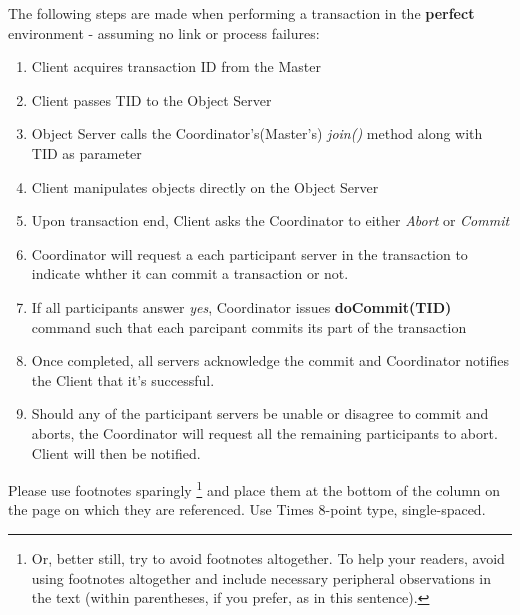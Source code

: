 \documentclass[times, 10pt,twocolumn]{article}
\begin{document}
The following steps are made when performing a transaction in the {\bf perfect} environment - assuming no link or process failures: 
\begin{enumerate}
\item Client acquires transaction ID from the Master
\item Client passes TID to the Object Server
\item Object Server calls the Coordinator's(Master's) {\it join()} method along with TID as parameter
\item Client manipulates objects directly on the Object Server
\item Upon transaction end, Client asks the Coordinator to either {\it Abort} or {\it Commit} 
\item Coordinator will request a each participant server in the transaction to indicate whther it can commit a transaction or not.
\item If all participants answer {\it yes}, Coordinator issues {\bf doCommit(TID)} command such that each parcipant commits its part of the transaction
\item Once completed, all servers acknowledge the commit and Coordinator notifies the Client that it's successful.
\item Should any of the participant servers be unable or disagree to commit and aborts, the Coordinator will request all the remaining participants to abort. Client will then be notified.
\end{enumerate}


Please use footnotes sparingly%
\footnote
   {%
     Or, better still, try to avoid footnotes altogether.  To help your 
     readers, avoid using footnotes altogether and include necessary 
     peripheral observations in the text (within parentheses, if you 
     prefer, as in this sentence).
   }
and place them at the bottom of the column on the page on which they are 
referenced. Use Times 8-point type, single-spaced.






\end{document}
